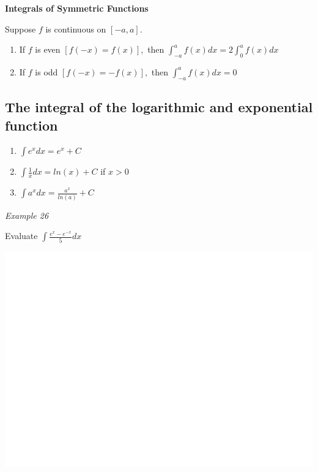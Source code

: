 \documentclass[]{book}
\providecommand{\tightlist}{%
  \setlength{\itemsep}{0pt}\setlength{\parskip}{0pt}}
\begin{document}
\newpage

\textbf{Integrals of Symmetric Functions}

Suppose \(f\) is continuous on \([-a,a].\)

\begin{enumerate}
\def\labelenumi{\alph{enumi})}
\tightlist
\item
  If \(f\) is even \([f(-x) = f(x)],\) then \(\int_{-a}^af(x) dx = 2\int_0^af(x)dx\)
\item
  If \(f\) is odd \([f(-x) = - f(x)],\) then \(\int_{-a}^af(x) dx = 0\)
\end{enumerate}

\newpage

\hypertarget{the-integral-of-the-logarithmic-and-exponential-function}{%
\subsection{The integral of the logarithmic and exponential function}\label{the-integral-of-the-logarithmic-and-exponential-function}}

\begin{enumerate}
\def\labelenumi{\arabic{enumi}.}
\item
  \(\int e^xdx = e^x + C\)
\item
  \(\int \frac{1}{x}dx = ln(x) + C\) if \(x>0\)
\item
  \(\int a^xdx = \frac{a^x}{ln (a)} + C\)
\end{enumerate}

\emph{Example 26}

Evaluate \(\int \frac{e^x - e^{-x}}{5} dx\)

\begin{center}\includegraphics[width=1\linewidth]{figure/LB45-1} \end{center}
\end{document}
